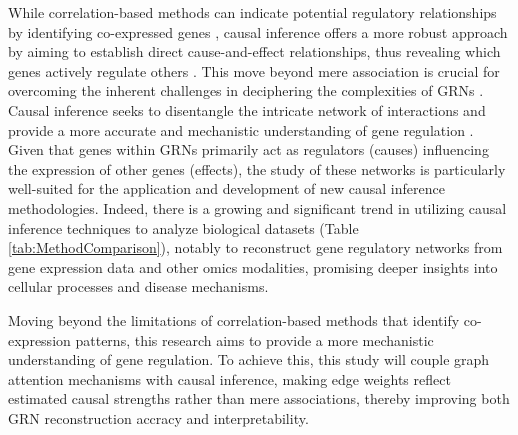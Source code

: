 While correlation-based methods can indicate potential regulatory relationships by identifying co-expressed genes \cite{mao2023predicting,kim2023gene}, causal inference offers a more robust approach by aiming to establish direct cause-and-effect relationships, thus revealing which genes actively regulate others \cite{mercatelli2020gene,dibaeinia2025interpretable,wang2024grace}. This move beyond mere association is crucial for overcoming the inherent challenges in deciphering the complexities of GRNs \cite{wang2025diffusion}. Causal inference seeks to disentangle the intricate network of interactions and provide a more accurate and mechanistic understanding of gene regulation \cite{dibaeinia2025interpretable,wang2024grace,otal2024analysis,feng2023gene}. Given that genes within GRNs primarily act as regulators (causes) influencing the expression of other genes (effects), the study of these networks is particularly well-suited for the application and development of new causal inference methodologies. Indeed, there is a growing and significant trend in utilizing causal inference techniques to analyze biological datasets \cite{wang2023dictys,feng2023gene,dong2024deep,du2024causal,dibaeinia2025interpretable} (Table \ref{tab:MethodComparison}), notably to reconstruct gene regulatory networks from gene expression data and other omics modalities, promising deeper insights into cellular processes and disease mechanisms.

Moving beyond the limitations of correlation-based methods that identify co-expression patterns, this research aims to provide a more mechanistic understanding of gene regulation. To achieve this,  this study will couple graph attention mechanisms with causal inference, making edge weights reflect estimated causal strengths rather than mere associations, thereby improving both GRN reconstruction accracy and interpretability.